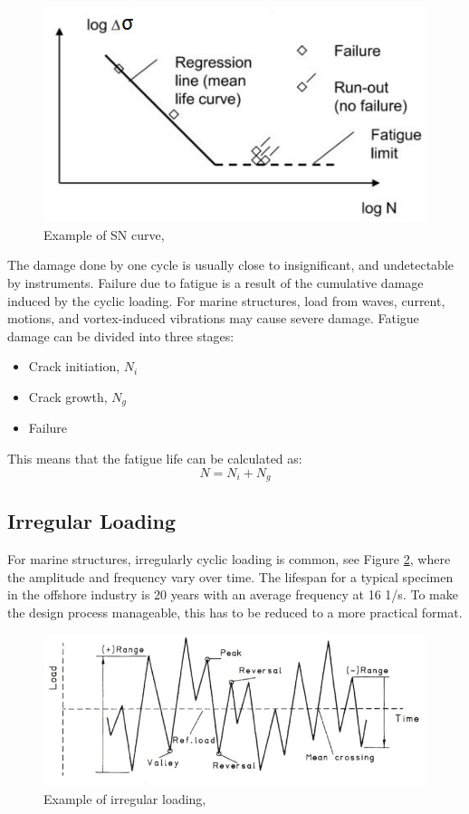 \begin{figure}[h!]
\centering
\includegraphics[scale=1]{figures/sn}
\caption[$\; \:$Example of SN curve]{Example of SN curve, \cite{fatigue2016} }
 \label{fig:sn}
\end{figure}

 \noindent The damage done by one cycle is usually close to insignificant, and undetectable by instruments. Failure due to fatigue is a result of the cumulative damage induced by the cyclic loading. For marine structures, load from waves, current, motions, and vortex-induced vibrations may cause severe damage. Fatigue damage can be divided into three stages:
 \begin{itemize}
     \item Crack initiation, $N_i$
     \item Crack growth, $N_g$
     \item Failure
 \end{itemize}
 This means that the fatigue life can be calculated as:
 \begin{equation}
     N=N_i+N_g
 \end{equation}
 
\subsection{Irregular Loading}
For marine structures, irregularly cyclic loading is common, see Figure \ref{fig:irr}, where the amplitude and frequency vary over time. The lifespan for a typical specimen in the offshore industry is 20 years with an average frequency at 16 1/s. To make the design process manageable, this has to be reduced to a more practical format.  

\begin{figure}[H]
\centering
\includegraphics[scale=0.8]{figures/irr}
\caption[$\; \:$Example of irregular loading]{Example of irregular loading, \cite{fatigue2016} }
 \label{fig:irr}
\end{figure}

